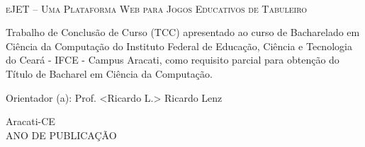 \vfill
\begin{center}

{\imprimirautor\\}
\vspace{3cm}
{\textsc{eJET – Uma Plataforma Web para Jogos
Educativos de Tabuleiro}\\}
\vspace{5cm}
\hspace{.45\linewidth}
\begin{minipage}{.50\linewidth}
Trabalho de Conclusão de Curso (TCC) apresentado ao curso de Bacharelado em Ciência da Computação do Instituto Federal de Educação, Ciência e Tecnologia do Ceará - IFCE - Campus Aracati, como requisito parcial para obtenção do Título de Bacharel em Ciência da Computação.

\vspace{0.5 cm}

Orientador (a): Prof. <Ricardo L.> Ricardo Lenz

\end{minipage}

\vspace{2cm}
\vfill
{\large Aracati-CE\\ANO DE PUBLICAÇÃO}

\end{center}
